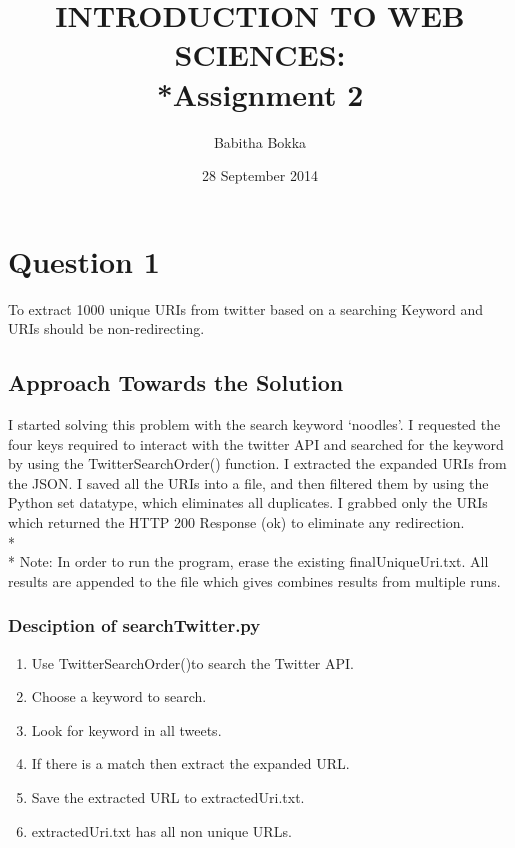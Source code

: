 \documentclass[12pt]{article}
\begin{document}
\begin{titlepage}
\title{INTRODUCTION TO WEB SCIENCES:\\*Assignment 2}
\author{Babitha Bokka}
\date{28 September 2014}
\maketitle
\end{titlepage}

\tableofcontents
\newpage
\section{Question 1}


To extract 1000 unique URIs from twitter based on a searching Keyword and URIs should be non-redirecting.
\subsection{Approach Towards the Solution}
I started solving this problem with the search keyword `noodles'. I requested the four keys required to interact with the twitter API and searched for the keyword by using the TwitterSearchOrder() function. I extracted the expanded URIs from the JSON. I saved all the URIs into a file, and then filtered them by using the Python set datatype, which eliminates all duplicates. I grabbed only the URIs which returned the HTTP 200 Response (ok) to eliminate any redirection.
\\*\\*
Note: In order to run the program, erase the existing finalUniqueUri.txt. All results are appended to the file which gives combines results from multiple runs.

\subsubsection{Desciption of searchTwitter.py}
\begin{enumerate}
	\item Use TwitterSearchOrder()to search the Twitter API.
	\item Choose a keyword to search.
	\item Look for keyword in all tweets.
	\item If there is a match then extract the expanded URL.
	\item Save the extracted URL to extractedUri.txt.
	\item extractedUri.txt has all non unique URLs.
\end{enumerate}
\end{document}
